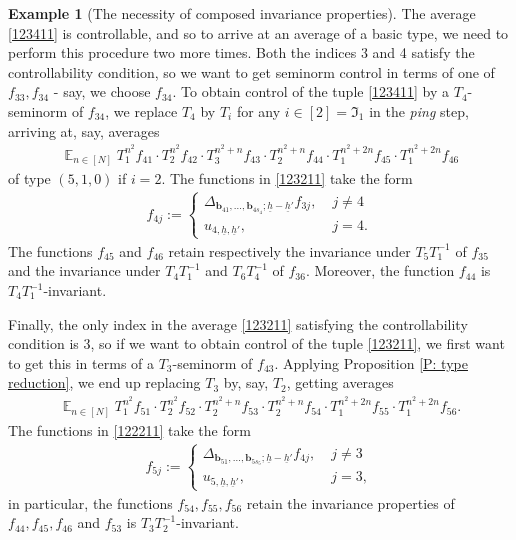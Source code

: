 \documentclass[11pt]{amsart}
\theoremstyle{definition}
\newtheorem{example}{Example}
\newcommand{\FI}{{\mathfrak I}}
\renewcommand{\b}{{\textbf{b}}}
\newcommand{\uh}{{\underline{h}}}
\newcommand{\inv}{^{-1}}
\DeclareMathOperator*{\E}{\mathbb{E}}
\begin{document}
\begin{example}[The necessity of composed invariance properties]
The average \eqref{123411} is controllable, and so to arrive at an average of a basic type, we need to perform this procedure two more times. Both the indices 3 and 4 satisfy the controllability condition, so we want to get seminorm control in terms of one of $f_{33}, f_{34}$ - say, we choose $f_{34}$. To obtain control of the tuple \eqref{123411} by a $T_4$-seminorm of $f_{34}$, we replace $T_4$ by $T_i$ for any $i\in[2] = \FI_1$ in the \textit{ping} step, arriving at, say, averages
\begin{align}\label{123211}
    \E_{n\in[N]}T_1^{n^2}f_{41} \cdot T_2^{n^2}f_{42}\cdot T_3^{n^2+n}f_{43}\cdot T_2^{n^2+n}f_{44} \cdot T_1^{n^2+2n}f_{45}\cdot T_1^{n^2+2n}f_{46}
\end{align}
of type $(5, 1, 0)$ if $i=2$. The functions in \eqref{123211} take the form
\begin{align*}
    f_{4j} := \begin{cases}
    \Delta_{\b_{41}, \ldots, \b_{4s_4}; \uh-\uh'}f_{3j},\; & j \neq 4\\
    u_{4,\uh, \uh'},\; &j=4.
    \end{cases}
\end{align*}
The functions $f_{45}$ and $f_{46}$ retain respectively the invariance under $T_5 T_1\inv$ of $f_{35}$ and the invariance under $T_4T_1\inv$ and $T_6 T_4\inv$ %
of $f_{36}$. Moreover, the function $f_{44}$ is $T_4 T_1\inv$-invariant.

Finally, the only index in the average \eqref{123211} satisfying the controllability condition is $3$, so if we want to obtain control of the tuple \eqref{123211}, we first want to get this in terms of a $T_3$-seminorm of $f_{43}$. Applying Proposition \ref{P: type reduction}, we end up replacing $T_3$ by, say, $T_2$, getting averages
\begin{align}\label{122211}
    \E_{n\in[N]}T_1^{n^2}f_{51} \cdot T_2^{n^2}f_{52}\cdot T_2^{n^2+n}f_{53}\cdot T_2^{n^2+n}f_{54} \cdot T_1^{n^2+2n}f_{55}\cdot T_1^{n^2+2n}f_{56}.
\end{align}
 The functions in \eqref{122211} take the form
\begin{align*}
    f_{5j} := \begin{cases}
    \Delta_{\b_{51}, \ldots, \b_{5s_5}; \uh-\uh'}f_{4j},\; & j \neq 3\\
    u_{5,\uh, \uh'},\; &j=3,
    \end{cases}
\end{align*}
in particular, the functions $f_{54}, f_{55}, f_{56}$ retain the invariance properties of $f_{44}, f_{45}, f_{46}$ and $f_{53}$ is $T_3T_2\inv$-invariant.


\end{example}
\end{document}
